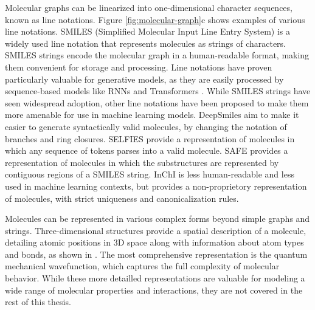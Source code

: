 Molecular graphs can be linearized into one-dimensional character sequences, known as line
notations. Figure \ref{fig:molecular-graph}c shows examples of various line notations. SMILES
(Simplified Molecular Input Line Entry System) \citep{weiningerSMILESChemicalLanguage1988} is a
widely used line notation that represents molecules as strings of characters. SMILES strings encode
the molecular graph in a human-readable format, making them convenient for storage and processing.
Line notations have proven particularly valuable for generative models, as they are easily processed
by sequence-based models like \acp{RNN} and Transformers
\citep{vaswaniAttentionAllYou2017}. While SMILES strings have seen widespread adoption,
other line notations have been proposed to make them
more amenable for use in machine learning models. DeepSmiles
\citep{oboyleDeepSMILESAdaptationSMILES2018} aim to make it easier to generate syntactically
valid molecules, by changing the notation of branches and ring closures. SELFIES
\citep{krennSELFIESFutureMolecular2022} provide a representation of molecules in which any sequence
of tokens parses into a valid molecule. SAFE \citep{noutahiGottaBeSAFE2023} provides a
representation of molecules in which the substructures are represented by contiguous regions of a
SMILES string. InChI \citep{hellerInChIIUPACInternational2015} is less human-readable and less used
in machine learning contexts, but provides a non-proprietory representation of molecules, with
strict uniqueness and canonicalization rules.

Molecules can be represented in various complex forms beyond simple graphs and strings.
Three-dimensional structures provide a spatial description of a molecule, detailing atomic positions
in 3D space along with information about atom types and bonds, as shown in
. The most comprehensive representation is the quantum mechanical
wavefunction, which captures the full complexity of molecular behavior. While these more
detailled representations are valuable for modeling a wide range of molecular properties and
interactions, they are not covered in the rest of this thesis.


